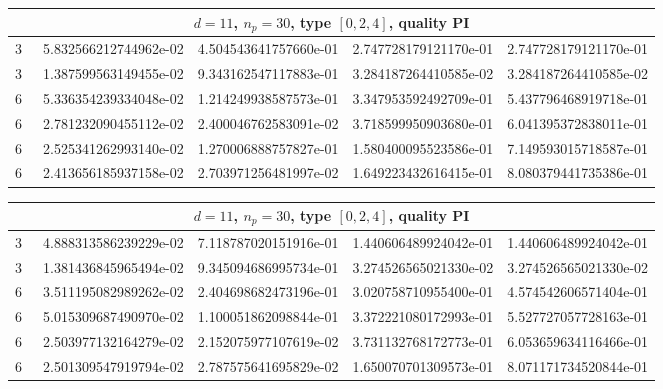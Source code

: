 \documentclass{article}
\begin{document}
\begin{center}
\begin{tabular}{rrrrr}
\multicolumn{5}{c}{\rmfamily $d=11$, $n_p=30$, type $[0,2,4]$, quality PI}\\
\toprule
3 & ~5.832566212744962e-02 & 4.504543641757660e-01 & 2.747728179121170e-01 & 2.747728179121170e-01\\
3 & ~1.387599563149455e-02 & 9.343162547117883e-01 & 3.284187264410585e-02 & 3.284187264410585e-02\\
6 & ~5.336354239334048e-02 & 1.214249938587573e-01 & 3.347953592492709e-01 & 5.437796468919718e-01\\
6 & ~2.781232090455112e-02 & 2.400046762583091e-02 & 3.718599950903680e-01 & 6.041395372838011e-01\\
6 & ~2.525341262993140e-02 & 1.270006888757827e-01 & 1.580400095523586e-01 & 7.149593015718587e-01\\
6 & ~2.413656185937158e-02 & 2.703971256481997e-02 & 1.649223432616415e-01 & 8.080379441735386e-01\\
\bottomrule
\end{tabular}
\bigskip

\begin{tabular}{rrrrr}
\multicolumn{5}{c}{\rmfamily $d=11$, $n_p=30$, type $[0,2,4]$, quality PI}\\
\toprule
3 & ~4.888313586239229e-02 & 7.118787020151916e-01 & 1.440606489924042e-01 & 1.440606489924042e-01\\
3 & ~1.381436845965494e-02 & 9.345094686995734e-01 & 3.274526565021330e-02 & 3.274526565021330e-02\\
6 & ~3.511195082989262e-02 & 2.404698682473196e-01 & 3.020758710955400e-01 & 4.574542606571404e-01\\
6 & ~5.015309687490970e-02 & 1.100051862098844e-01 & 3.372221080172993e-01 & 5.527727057728163e-01\\
6 & ~2.503977132164279e-02 & 2.152075977107619e-02 & 3.731132768172773e-01 & 6.053659634116466e-01\\
6 & ~2.501309547919794e-02 & 2.787575641695829e-02 & 1.650070701309573e-01 & 8.071171734520844e-01\\
\bottomrule
\end{tabular}
\bigskip


\end{center}
\end{document}
